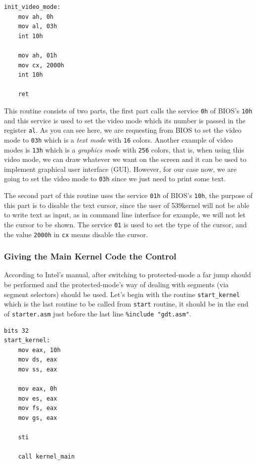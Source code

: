 \begin{lstlisting}
init_video_mode:
    mov ah, 0h
    mov al, 03h
    int 10h
    
    mov ah, 01h
    mov cx, 2000h
    int 10h
    
    ret
\end{lstlisting}

This routine consists of two parts, the first part calls the service
\lstinline!0h! of BIOS's \lstinline!10h! and this service is used to set
the video mode which its number is passed in the register
\lstinline!al!. As you can see here, we are requesting from BIOS to set
the video mode to \lstinline!03h! which is a \emph{text mode} with
\lstinline!16! colors. Another example of video modes is \lstinline!13h!
which is a \emph{graphics mode} with \lstinline!256! colors, that is,
when using this video mode, we can draw whatever we want on the screen
and it can be used to implement graphical user interface (GUI). However,
for our case now, we are going to set the video mode to \lstinline!03h!
since we just need to print some text.

The second part of this routine uses the service \lstinline!01h! of
BIOS's \lstinline!10h!, the purpose of this part is to disable the text
cursor, since the user of 539kernel will not be able to write text as
input, as in command line interface for example, we will not let the
cursor to be shown. The service \lstinline!01! is used to set the type
of the cursor, and the value \lstinline!2000h! in \lstinline!cx! means
disable the cursor.

\subsubsection{Giving the Main Kernel Code the
Control}\label{giving-the-main-kernel-code-the-control}

According to Intel's manual, after switching to protected-mode a far
jump should be performed and the protected-mode's way of dealing with
segments (via segment selectors) should be used. Let's begin with the
routine \lstinline!start_kernel! which is the last routine to be called
from \lstinline!start! routine, it should be in the end of
\lstinline!starter.asm! just before the last line
\lstinline!%include "gdt.asm"!.

\begin{lstlisting}
bits 32
start_kernel:
    mov eax, 10h
    mov ds, eax
    mov ss, eax
    
    mov eax, 0h
    mov es, eax
    mov fs, eax
    mov gs, eax
    
    sti
    
    call kernel_main
\end{lstlisting}

